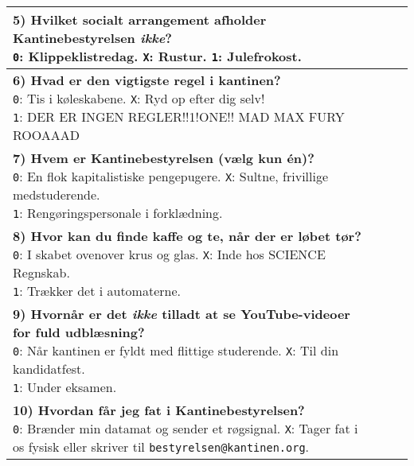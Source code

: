 \documentclass[a4paper]{article}
\begin{document}
\begin{center}
\begin{tabular}{|p{12cm}|p{0.2cm}|p{0.2cm}|p{0.2cm}|}
{  \textbf{5) Hvilket socialt arrangement afholder Kantinebestyrelsen
  \emph{ikke}?} \\
  \texttt{0}: Klippeklistredag. \quad
  \texttt{X}: Rustur. \quad
  \texttt{1}: Julefrokost.
  \vspace{0.1cm}
} & & & \\\hline
\parbox{12cm}{
  \vspace{0.2cm}
  \textbf{6) Hvad er den vigtigste regel i kantinen?} \\
  \texttt{0}: Tis i køleskabene. \quad
  \texttt{X}: Ryd op efter dig selv! \\
  \texttt{1}: DER ER INGEN REGLER!!1!ONE!!  MAD MAX FURY ROOAAAD
  \vspace{0.1cm}
} & & & \\\hline
\parbox{12cm}{
  \vspace{0.2cm}
  \textbf{7) Hvem er Kantinebestyrelsen (vælg kun én)?} \\
  \texttt{0}: En flok kapitalistiske pengepugere. \quad
  \texttt{X}: Sultne, frivillige medstuderende. \\
  \texttt{1}: Rengøringspersonale i forklædning.
  \vspace{0.1cm}
} & & & \\\hline
\parbox{12cm}{
  \vspace{0.2cm}
  \textbf{8) Hvor kan du finde kaffe og te, når der er løbet tør?} \\
  \texttt{0}: I skabet ovenover krus og glas. \quad
  \texttt{X}: Inde hos SCIENCE Regnskab. \\
  \texttt{1}: Trækker det i automaterne.
  \vspace{0.1cm}
} & & & \\\hline
\parbox{12cm}{
  \vspace{0.2cm}
  \textbf{9) Hvornår er det \emph{ikke} tilladt at se YouTube-videoer for fuld
  udblæsning?} \\
  \texttt{0}: Når kantinen er fyldt med flittige studerende. \quad
  \texttt{X}: Til din kandidatfest. \\
  \texttt{1}: Under eksamen.
  \vspace{0.1cm}
} & & & \\\hline
\parbox{12cm}{
  \vspace{0.2cm}
  \textbf{10) Hvordan får jeg fat i Kantinebestyrelsen?} \\
  \texttt{0}: Brænder min datamat og sender et røgsignal. \quad
  \texttt{X}: Tager fat i os fysisk eller skriver til \texttt{bestyrelsen@kantinen.org}. \\
}
\end{tabular}
\end{center}
\end{document}
